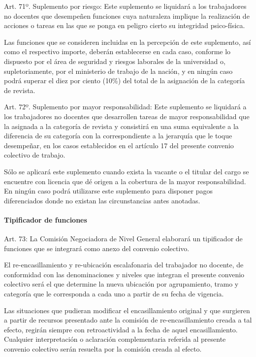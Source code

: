\documentclass[]{article}
\let\oldparagraph\paragraph
\renewcommand{\paragraph}[1]{\oldparagraph{#1}\mbox{}}
\begin{document}
Art. 71º. Suplemento por riesgo: Este suplemento se liquidará a los
trabajadores no docentes que desempeñen funciones cuya naturaleza
implique la realización de acciones o tareas en las que se ponga en
peligro cierto su integridad psico-física.

Las funciones que se consideren incluidas en la percepción de este
suplemento, así como el respectivo importe, deberán establecerse en cada
caso, conforme lo dispuesto por el área de seguridad y riesgos laborales
de la universidad o, supletoriamente, por el ministerio de trabajo de la
nación, y en ningún caso podrá superar el diez por ciento (10\%) del
total de la asignación de la categoría de revista.

Art. 72º. Suplemento por mayor responsabilidad: Este suplemento se
liquidará a los trabajadores no docentes que desarrollen tareas de mayor
responsabilidad que la asignada a la categoría de revista y consistirá
en una suma equivalente a la diferencia de su categoría con la
correspondiente a la jerarquía que le toque desempeñar, en los casos
establecidos en el artículo 17 del presente convenio colectivo de
trabajo.

Sólo se aplicará este suplemento cuando exista la vacante o el titular
del cargo se encuentre con licencia que dé origen a la cobertura de la
mayor responsabilidad. En ningún caso podrá utilizarse este suplemento
para disponer pagos diferenciados donde no existan las circunstancias
antes anotadas.

\paragraph{Tipificador de funciones}\label{tipificador-de-funciones}

Art. 73: La Comisión Negociadora de Nivel General elaborará un
tipificador de funciones que se integrará como anexo del convenio
colectivo.

El re-encasillamiento y re-ubicación escalafonaria del trabajador no
docente, de conformidad con las denominaciones y niveles que integran el
presente convenio colectivo será el que determine la nueva ubicación por
agrupamiento, tramo y categoría que le corresponda a cada uno a partir
de su fecha de vigencia.

Las situaciones que pudieran modificar el encasillamiento original y que
surgieren a partir de recursos presentado ante la comisión de
re-encasillamiento creada a tal efecto, regirán siempre con
retroactividad a la fecha de aquel encasillamiento. Cualquier
interpretación o aclaración complementaria referida al presente convenio
colectivo serán resuelta por la comisión creada al efecto.
\end{document}
